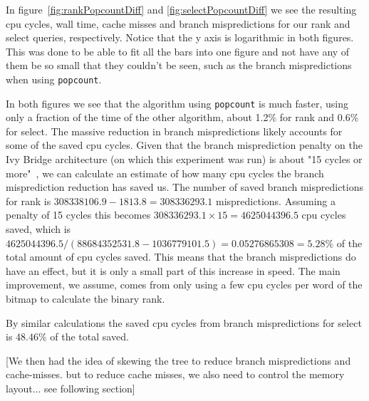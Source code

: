 In figure~\ref{fig:rankPopcountDiff} and \ref{fig:selectPopcountDiff} we see the resulting cpu cycles, wall time, cache misses and branch mispredictions for our rank and select queries, respectively.
Notice that the y axis is logarithmic in both figures. This was done to be able to fit all the bars into one figure and not have any of them be so small that they couldn't be seen, such as the branch mispredictions when using \texttt{popcount}.

In both figures we see that the algorithm using \texttt{popcount} is much faster, using only a fraction of the time of the other algorithm, about 1.2\% for rank and 0.6\% for select.
The massive reduction in branch mispredictions likely accounts for some of the saved cpu cycles.
Given that the branch misprediction penalty on the Ivy Bridge architecture (on which this experiment was run) is about "15 cycles or more"~\cite{agner}, we can calculate an estimate of how many cpu cycles the branch misprediction reduction has saved us.
The number of saved branch mispredictions for rank is $\num{308338106.9} - \num{1813.8} = \num{308336293.1}$ mispredictions. Assuming a penalty of 15 cycles this becomes $\num{308336293.1} \times 15 = \num{4625044396.5}$ cpu cycles saved, which is $\num{4625044396.5} / (\num{88684352531.8} - \num{1036779101.5}) = \num{0.05276865308} = 5.28\%$ of the total amount of cpu cycles saved.
This means that the branch mispredictions do have an effect, but it is only a small part of this increase in speed. The main improvement, we assume, comes from only using a few cpu cycles per word of the bitmap to calculate the binary rank.

By similar calculations the saved cpu cycles from branch mispredictions for select is $48.46\%$ of the total saved. 








[We then had the idea of skewing the tree to reduce branch mispredictions and cache-misses. but to reduce cache misses, we also need to control the memory layout... see following section]